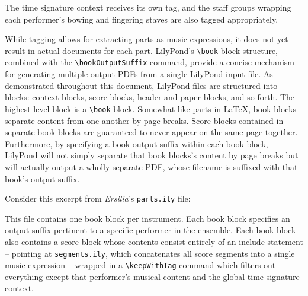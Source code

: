 
\noindent The time signature context receives its own tag, and the staff groups
wrapping each performer's bowing and fingering staves are also tagged
appropriately.

While tagging allows for extracting parts as music expressions, it does not yet
result in actual documents for each part. LilyPond's
\texttt{\textbackslash{}book} block structure, combined with the
\texttt{\textbackslash{}bookOutputSuffix} command, provide a concise mechanism
for generating multiple output PDFs from a single LilyPond input file. As
demonstrated throughout this document, LilyPond files are structured into
blocks: context blocks, score blocks, header and paper blocks, and so forth.
The highest level block is a \texttt{\textbackslash{}book} block. Somewhat like
parts in LaTeX, book blocks separate content from one another by page breaks.
Score blocks contained in separate book blocks are guaranteed to never appear
on the same page together. Furthermore, by specifying a book output suffix
within each book block, LilyPond will not simply separate that book blocks's
content by page breaks but will actually output a wholly separate PDF, whose
filename is suffixed with that book's output suffix.

Consider this excerpt from \emph{Ersilia}'s \texttt{parts.ily} file:


\noindent This file contains one book block per instrument. Each book block
specifies an output suffix pertinent to a specific performer in the ensemble.
Each book block also contains a score block whose contents consist entirely of
an include statement -- pointing at \texttt{segments.ily}, which concatenates
all score segments into a single music expression -- wrapped in a
\texttt{\textbackslash{}keepWithTag} command which filters out everything
except that performer's musical content and the global time signature context.

